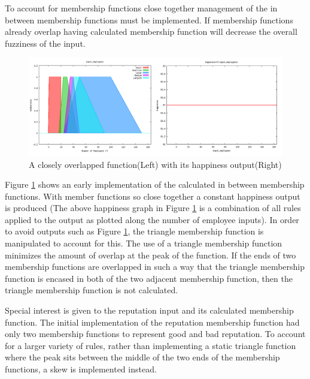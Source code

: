 \documentclass[12pt,fleqn,reqno,letterpaper]{article}
\begin{document}
To account for membership functions close together management of the in between membership functions must be implemented.  If membership functions already overlap having calculated membership function will decrease the overall fuzziness of the input.

\begin{figure}[H]
  \centering
  \includegraphics[scale=0.5,natwidth=1297,natheight=501]{fig/overlap.png}
  \caption{A closely overlapped function(Left) with its happiness output(Right)}
  \label{fig:OVERLAP}
\end{figure}

Figure \ref{fig:OVERLAP} shows an early implementation of the calculated in between membership functions.  With member functions so close together a constant happiness output is produced (The above happiness graph in Figure \ref{fig:OVERLAP} is a combination of all rules applied to the output as plotted along the number of employee inputs).  In order to avoid outputs such as Figure \ref{fig:OVERLAP}, the triangle membership function is manipulated to account for this.  The use of a triangle membership function minimizes the amount of overlap at the peak of the function.  If the ends of two membership functions are overlapped in such a way that the triangle membership function is encased in both of the two adjacent membership function, then the triangle membership function is not calculated.

Special interest is given to the reputation input and its calculated membership function.  The initial implementation of the reputation membership function had only two membership functions to represent good and bad reputation.  To account for a larger variety of rules, rather than implementing a static triangle function where the peak sits between the middle of the two ends of the membership functions, a skew is implemented instead.
\end{document}
